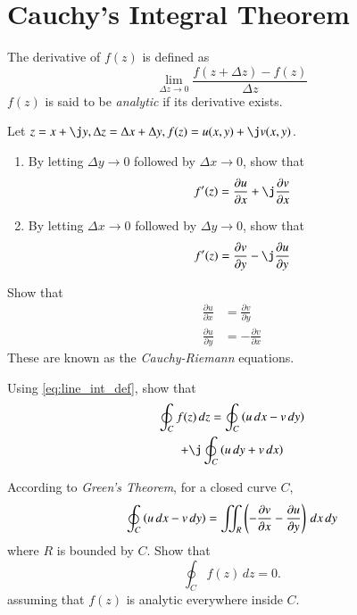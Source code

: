 \documentclass[journal,12pt,twocolumn]{IEEEtran}
\begin{document}
\section{Cauchy's Integral Theorem}
\begin{definition}
 The  derivative of $f(z)$ is defined as
\begin{equation}
\lim_{\Delta z \to 0} \frac{f(z+\Delta z)-f(z)}{\Delta z}
\end{equation}
$f(z)$ is said to be {\em analytic} if its derivative exists.
\end{definition}
\begin{problem}
Let $z = x + \j y, \Delta z = \Delta x + \Delta y, f(z) = u(x,y)+\j v(x,y)$. 
\begin{enumerate}
\item By letting $\Delta y \to 0$ followed by $\Delta x \to 0$, show that
\begin{align}
f^{\prime}(z) = \frac{\partial u}{\partial x} + \j \frac{\partial v}{\partial x}
\end{align}
\item By letting $\Delta x \to 0$ followed by $\Delta y \to 0$, show that
\begin{align}
f^{\prime}(z) = \frac{\partial v}{\partial y} - \j \frac{\partial u}{\partial y}
\end{align}
\end{enumerate}
\end{problem}
\begin{problem}
Show that
\begin{align}
\frac{\partial u}{\partial x} &= \frac{\partial v}{\partial y}
\\
\frac{\partial u}{\partial y} &= -\frac{\partial v}{\partial x}
\end{align}
These are known as the {\em Cauchy-Riemann} equations.
\end{problem}
%
\begin{problem}
Using \eqref{eq:line_int_def}, show that
\begin{multline}
\oint_{C}f(z)\,dz = \oint_{C}\brak{u\,dx- v\,dy }
\\
+ \j \oint_{C}\brak{u\,dy+v\,dx}
\end{multline}
\end{problem}
\begin{problem}
According to {\em Green's Theorem}, for a closed curve $C$,
\begin{equation}
\oint_{C}\left(u\,dx- v\,dy\right) = \iint_{R} \left(-\frac{\partial v}{\partial x}-\frac{\partial u}{\partial y}\right)\,dx\,dy
\end{equation}
where $R$ is bounded by $C$.  Show that
\begin{equation}
\oint_{C}f(z)\,dz  = 0.
\end{equation}
assuming that $f(z)$ is analytic everywhere inside $C$.
\end{problem}
\end{document}
